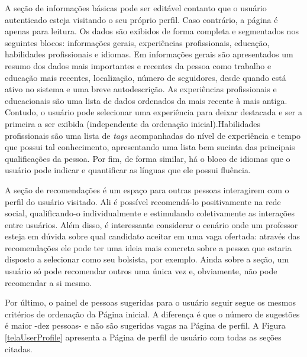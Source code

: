\documentclass[cic,tc]{iiufrgs}
\begin{document}
A seção de informações básicas pode ser editável contanto que o usuário autenticado esteja visitando o seu próprio perfil. Caso contrário, a página é apenas para leitura. Os dados são exibidos de forma completa e segmentados nos seguintes blocos: informações gerais, experiências profissionais, educação, habilidades profissionais e idiomas. Em informações gerais são apresentados um resumo dos dados mais importantes e recentes da pessoa como trabalho e educação mais recentes, localização, número de seguidores, desde quando está ativo no sistema e uma breve autodescrição. As experiências profissionais e educacionais são uma lista de dados ordenados da mais recente à mais antiga. Contudo, o usuário pode selecionar uma experiência para deixar destacada e ser a primeira a ser exibida (independente da ordenação inicial).Habilidades profissionais são uma lista de \textit{tags} acompanhadas do nível de experiência e tempo que possui tal conhecimento, apresentando uma lista bem sucinta das principais qualificações da pessoa. Por fim, de forma similar, há o bloco de idiomas que o usuário pode indicar e quantificar as línguas que ele possui fluência.

A seção de recomendações é um espaço para outras pessoas interagirem com o perfil do usuário visitado. Ali é possível recomendá-lo positivamente na rede social, qualificando-o individualmente e estimulando coletivamente as interações entre usuários. Além disso, é interessante considerar o cenário onde um professor esteja em dúvida sobre qual candidato aceitar em uma vaga ofertada: através das recomendações ele pode ter uma ideia mais concreta sobre a pessoa que estaria disposto a selecionar como seu bolsista, por exemplo. Ainda sobre a seção, um usuário só pode recomendar outros uma única vez e, obviamente, não pode recomendar a si mesmo.

Por último, o painel de pessoas sugeridas para o usuário seguir segue os mesmos critérios de ordenação da Página inicial. A diferença é que o número de sugestões é maior -dez pessoas- e não são sugeridas vagas na Página de perfil. A Figura \ref{telaUserProfile} apresenta a Página de perfil de usuário com todas as seções citadas.
\end{document}
